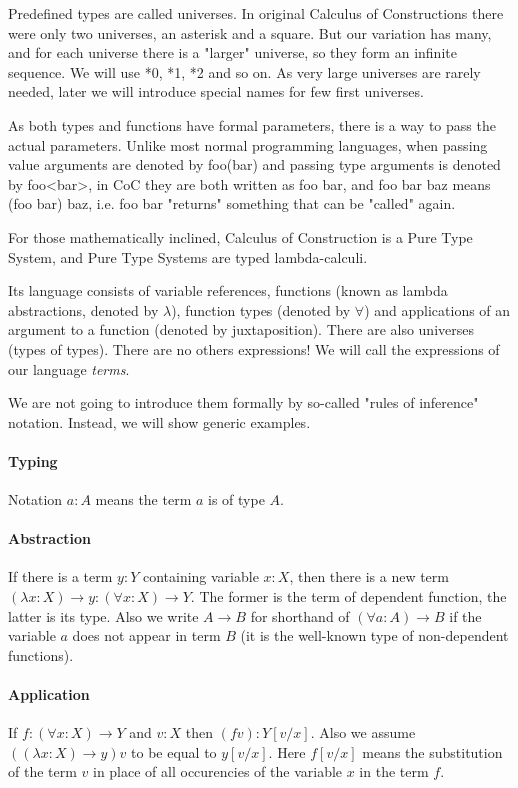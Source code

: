 \documentclass[11pt,oneside]{article}
\begin{document}
Predefined types are called universes. In original Calculus of Constructions
there were only two universes, an asterisk and a square. But our variation has
many, and for each universe there is a "larger" universe, so they form an infinite sequence. We will use *0, *1, *2 and so on.
As very large universes are rarely needed, later we will introduce special names for few first universes.

As both types and functions have formal parameters, there is a way to pass the actual parameters. Unlike most normal programming languages, when passing value arguments are denoted by foo(bar) and passing type arguments is denoted by foo<bar>, in
CoC they are both written as foo bar, and foo bar baz means (foo bar) baz, i.e. foo bar "returns" something that can be "called" again.

For those mathematically inclined, Calculus of Construction is a Pure Type System, and Pure Type Systems are typed lambda-calculi.

Its language consists of variable references,
functions (known as lambda abstractions,
denoted by $\lambda$),
function types (denoted by $\forall$)
and applications of an argument to a function
(denoted by juxtaposition).
There are also universes (types of types).
There are no others expressions!
We will call the expressions of our language  {\em terms}.

We are not going to introduce them formally by so-called
"rules of inference" notation. Instead, we will show generic examples.

\paragraph{Typing}
Notation $a : A$ means the term $a$ is of type $A$.

\paragraph{Abstraction}
If there is a term $y : Y$ containing variable $x : X$,
then there is a new term
$(\lambda x : X) \rightarrow y : (\forall x : X) \rightarrow Y$.
The former is the term of dependent function, the latter is its type.
Also we write $A \rightarrow B$ for shorthand of
$(\forall a : A) \rightarrow B$ if the variable $a$
does not appear in term $B$
(it is the well-known type of non-dependent functions).

\paragraph{Application}
If $f : (\forall x : X)\rightarrow Y$ and $v : X$  then $(f v) : Y[v/x]$.
Also we assume $((\lambda x : X)\rightarrow y) v$
to be equal to $y[v/x]$.
Here $f[v/x]$ means the substitution of the term $v$ in place of all
occurencies of the variable $x$ in the term $f$.
\end{document}
